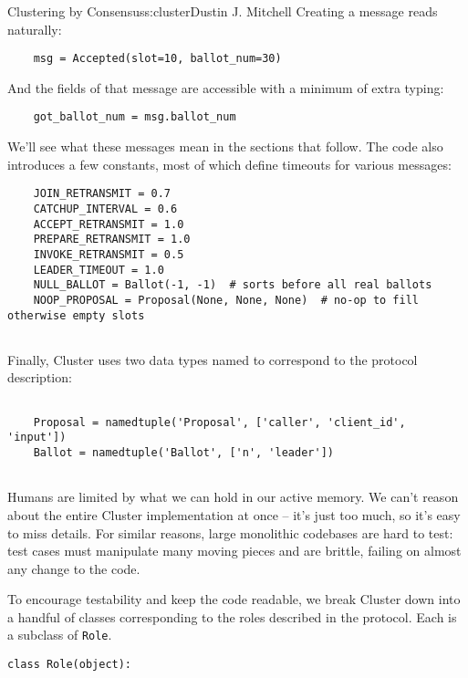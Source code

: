 \begin{aosachapter}{Clustering by Consensus}{s:cluster}{Dustin J. Mitchell}
Creating a message reads naturally:

\begin{verbatim}
    msg = Accepted(slot=10, ballot_num=30)
\end{verbatim}

And the fields of that message are accessible with a minimum of extra
typing:

\begin{verbatim}
    got_ballot_num = msg.ballot_num
\end{verbatim}

We'll see what these messages mean in the sections that follow. The code
also introduces a few constants, most of which define timeouts for
various messages:

\begin{verbatim}
    JOIN_RETRANSMIT = 0.7
    CATCHUP_INTERVAL = 0.6
    ACCEPT_RETRANSMIT = 1.0
    PREPARE_RETRANSMIT = 1.0
    INVOKE_RETRANSMIT = 0.5
    LEADER_TIMEOUT = 1.0
    NULL_BALLOT = Ballot(-1, -1)  # sorts before all real ballots
    NOOP_PROPOSAL = Proposal(None, None, None)  # no-op to fill otherwise empty slots
    
\end{verbatim}

Finally, Cluster uses two data types named to correspond to the protocol
description:

\begin{verbatim}

    Proposal = namedtuple('Proposal', ['caller', 'client_id', 'input'])
    Ballot = namedtuple('Ballot', ['n', 'leader'])
    
\end{verbatim}

\label{component-model}

Humans are limited by what we can hold in our active memory. We can't
reason about the entire Cluster implementation at once -- it's just too
much, so it's easy to miss details. For similar reasons, large
monolithic codebases are hard to test: test cases must manipulate many
moving pieces and are brittle, failing on almost any change to the code.

To encourage testability and keep the code readable, we break Cluster
down into a handful of classes corresponding to the roles described in
the protocol. Each is a subclass of \texttt{Role}.

\begin{verbatim}
class Role(object):


\end{verbatim}
\end{aosachapter}
